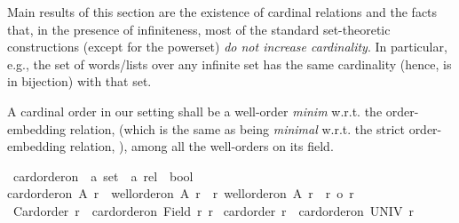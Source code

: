 \begin{isabellebody}
\begin{isamarkuptext}
Main results of this section are the existence of cardinal relations and the
facts that, in the presence of infiniteness,
most of the standard set-theoretic constructions (except for the powerset)
{\em do not increase cardinality}.  In particular, e.g., the set of words/lists over
any infinite set has the same cardinality (hence, is in bijection) with that set.%
\end{isamarkuptext}\isamarkuptrue%
%
\isadelimdocument
%
\endisadelimdocument
%
\isatagdocument
%
\isamarkuptrue%
%
\endisatagdocument
{\isafolddocument}%
%
\isadelimdocument
%
\endisadelimdocument
%
\begin{isamarkuptext}%
A cardinal order in our setting shall be a well-order {\em minim} w.r.t. the
order-embedding relation,  (which is the same as being {\em minimal} w.r.t. the
strict order-embedding relation, ), among all the well-orders on its field.%
\end{isamarkuptext}\isamarkuptrue%
\isamarkupfalse%
\ card{\isacharunderscore}{\kern0pt}order{\isacharunderscore}{\kern0pt}on\ {\isacharcolon}{\kern0pt}{\isacharcolon}{\kern0pt}\ {\isachardoublequoteopen}{\isacharprime}{\kern0pt}a\ set\ {\isasymRightarrow}\ {\isacharprime}{\kern0pt}a\ rel\ {\isasymRightarrow}\ bool{\isachardoublequoteclose}\isanewline
{}\isanewline
{\isachardoublequoteopen}card{\isacharunderscore}{\kern0pt}order{\isacharunderscore}{\kern0pt}on\ A\ r\ {\isasymequiv}\ well{\isacharunderscore}{\kern0pt}order{\isacharunderscore}{\kern0pt}on\ A\ r\ {\isasymand}\ {\isacharparenleft}{\kern0pt}{\isasymforall}r{\isacharprime}{\kern0pt}{\isachardot}{\kern0pt}\ well{\isacharunderscore}{\kern0pt}order{\isacharunderscore}{\kern0pt}on\ A\ r{\isacharprime}{\kern0pt}\ {\isasymlongrightarrow}\ r\ {\isasymle}o\ r{\isacharprime}{\kern0pt}{\isacharparenright}{\kern0pt}{\isachardoublequoteclose}\isanewline
\isanewline
{}\isamarkupfalse%
\ {\isachardoublequoteopen}Card{\isacharunderscore}{\kern0pt}order\ r\ {\isasymequiv}\ card{\isacharunderscore}{\kern0pt}order{\isacharunderscore}{\kern0pt}on\ {\isacharparenleft}{\kern0pt}Field\ r{\isacharparenright}{\kern0pt}\ r{\isachardoublequoteclose}\isanewline
{}\isamarkupfalse%
\ {\isachardoublequoteopen}card{\isacharunderscore}{\kern0pt}order\ r\ {\isasymequiv}\ card{\isacharunderscore}{\kern0pt}order{\isacharunderscore}{\kern0pt}on\ UNIV\ r{\isachardoublequoteclose}\isanewline
\isanewline
{}\isamarkupfalse%

\end{isabellebody}

